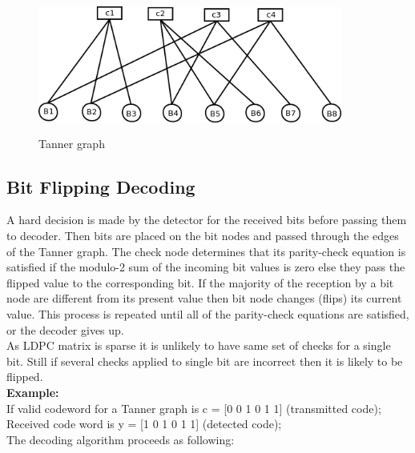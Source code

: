 \begin{figure}[h!]
\centering
\includegraphics[height=4.5cm,width=10cm]{minSum1}
\caption[Tanner graph]{Tanner graph}
\end{figure}



\subsection{Bit Flipping Decoding} 


 A hard decision is made by the detector for the received bits before passing them to decoder.
Then bits are placed on the bit nodes and passed through the edges of the Tanner graph.
The check node determines that its parity-check equation is satisfied if the modulo-2 sum of the incoming bit values is zero else they pass the flipped value to the corresponding bit.
If the majority of the reception by a bit node are different from its present value then bit node changes (flips) its current value.
This process is repeated until all of the parity-check equations are satisfied, or the decoder gives up.\cite{9}\\
As LDPC matrix is sparse it is unlikely to have same set of checks for a single bit. Still if several checks applied to single bit are incorrect then it is likely to be flipped. \\
\textbf{Example:} \\
If valid codeword for a Tanner graph is c = [0 0 1 0 1 1] (transmitted code); \\
Received code word is y = [1 0 1 0 1 1] (detected code);\\
The decoding algorithm proceeds as following:

